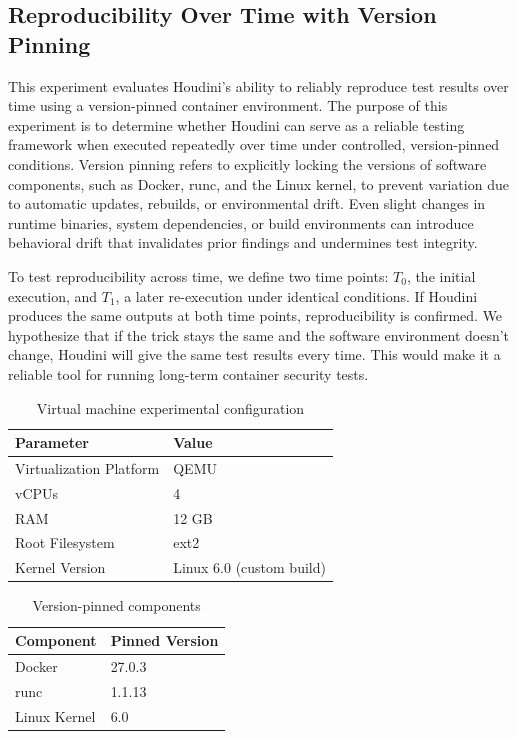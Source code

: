 \begin{doublespace}
\section{Reproducibility Over Time with Version Pinning}

This experiment evaluates Houdini’s ability to reliably reproduce test results over time using a version-pinned container environment. The purpose of this experiment is to determine whether Houdini can serve as a reliable testing framework when executed repeatedly over time under controlled, version-pinned conditions. Version pinning refers to explicitly locking the versions of software components, such as Docker, runc, and the Linux kernel, to prevent variation due to automatic updates, rebuilds, or environmental drift. Even slight changes in runtime binaries, system dependencies, or build environments can introduce behavioral drift that invalidates prior findings and undermines test integrity.

To test reproducibility across time, we define two time points: \( T_0 \), the initial execution, and \( T_1 \), a later re-execution under identical conditions. If Houdini produces the same outputs at both time points, reproducibility is confirmed. We hypothesize that if the trick stays the same and the software environment doesn't change, Houdini will give the same test results every time. This would make it a reliable tool for running long-term container security tests. 

\begin{table}[H]
\centering
\caption{Virtual machine experimental configuration}
\begin{tabular}{|l|l|}
\hline
\textbf{Parameter} & \textbf{Value} \\
\hline
Virtualization Platform & QEMU \\
vCPUs & 4 \\
RAM & 12 GB \\
Root Filesystem & ext2 \\
Kernel Version & Linux 6.0 (custom build) \\
\hline
\end{tabular}
\end{table}

\begin{table}[H]
\centering
\caption{Version-pinned components}
\begin{tabular}{|l|l|}
\hline
\textbf{Component} & \textbf{Pinned Version} \\
\hline
Docker & 27.0.3 \\
runc & 1.1.13 \\
Linux Kernel & 6.0 \\
\hline
\end{tabular}
\end{table}


\end{doublespace}
